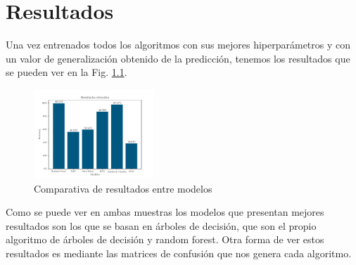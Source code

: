 
\chapter{Resultados} \label{chap:result}

Una vez entrenados todos los algoritmos con sus mejores hiperparámetros y con un valor de generalización obtenido de la predicción, tenemos los resultados que se pueden ver en la Fig. \ref{fig:comp_accur}.

\begin{figure}
    \centering
    \includegraphics[width=0.4\textwidth]{../Python/plots/parallel/accur_results}
    \caption{Comparativa de resultados entre modelos}
    \label{fig:comp_accur}
\end{figure}

Como se puede ver en ambas muestras los modelos que presentan mejores resultados son los que se basan en árboles de decisión, que son el propio algoritmo de árboles de decisión y random forest. Otra forma de ver estos resultados es mediante las matrices de confusión que nos genera cada algoritmo.


